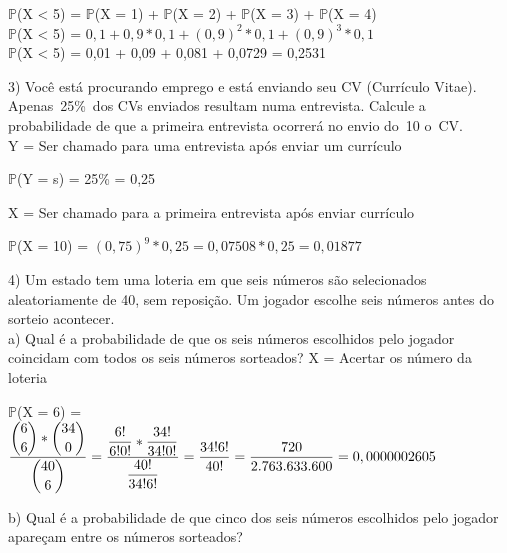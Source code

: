 \documentclass[12pt,a4paper,draft]{article}
\begin{document}
	\begin{center}
		\vspace{0.5cm}
		$\mathbb{P}$(X < 5) = $\mathbb{P}$(X = 1) + $\mathbb{P}$(X = 2) + $\mathbb{P}$(X = 3) + $\mathbb{P}$(X = 4)
		\vspace{0.5cm}\\
		$\mathbb{P}$(X < 5) = $0,1 + 0,9 * 0,1 + \left(0,9\right)^2 * 0,1 + \left(0,9\right)^3 * 0,1$ 
		\vspace{0.5cm}\\
		$\mathbb{P}$(X < 5) = 0,01 + 0,09 + 0,081 + 0,0729 = 0,2531
	\end{center}
\vspace{1cm}
	3) Você está procurando emprego e está enviando seu CV (Currículo Vitae).	Apenas 25\% dos CVs enviados resultam numa entrevista. Calcule a probabilidade de que a primeira entrevista ocorrerá no envio do 10 o CV.
	\vspace{0.5cm}\\
	Y = Ser chamado para uma entrevista após enviar um currículo
	\begin{center}
		\vspace{0.5cm}
		$\mathbb{P}$(Y = s) = 25\% = 0,25
	\end{center}
	\vspace{1cm}
	X = Ser chamado para a primeira entrevista após enviar currículo
	\begin{center}
		\vspace{0.5cm}
		$\mathbb{P}$(X = 10) = $\left(0,75\right)^9 * 0,25 = 0,07508 * 0,25 = 0,01877$ 
	\end{center}
	\vspace{1cm}
	4) Um estado tem uma loteria em que seis números são selecionados
	aleatoriamente de 40, sem reposição. Um jogador escolhe seis números antes do sorteio acontecer.\\
	a) Qual é a probabilidade de que os seis números escolhidos pelo jogador coincidam com todos os seis números sorteados?
	\vspace{0.5cm}
	X = Acertar os número da loteria
	\begin{center}
		\vspace{0.5cm}
		$\mathbb{P}$(X = 6) = $\dfrac{\dbinom{6}{6} * \dbinom{34}{0}}{\dbinom{40}{6}} = \dfrac{\dfrac{6!}{6!0!} * \dfrac{34!}{34!0!}}{\dfrac{40!}{34! 6!}} = \dfrac{34!6!}{40!} = \dfrac{720}{2.763.633.600} = 0,0000002605$
	\end{center}
	\vspace{1cm}
	b) Qual é a probabilidade de que cinco dos seis números escolhidos pelo jogador apareçam entre os números sorteados?
\end{document}

